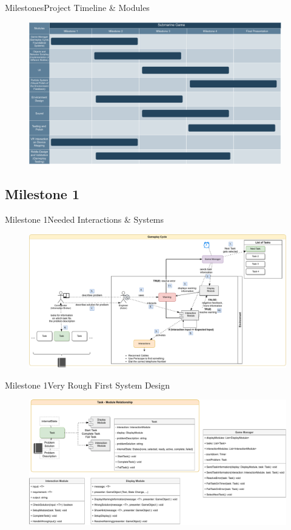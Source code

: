 \documentclass[t,aspectratio=169,divpsnames]{beamer}
\begin{document}
\begin{frame}{Milestones}{Project Timeline \& Modules}
    \begin{figure}
    \vspace{-0.1cm}
	\includegraphics[width=11cm]{images/Timeline_VR-AR.pdf}
	
\end{figure}
\end{frame}
\subsection{Milestone 1}
\begin{frame}{Milestone 1}{Needed Interactions \& Systems}
    \begin{figure}
    \vspace{-0.1cm}
	\includegraphics[width=12.5cm]{images/gameplay_cycle.pdf}
	
\end{figure}
\end{frame}

\begin{frame}{Milestone 1}{Very Rough First System Design}
    \begin{figure}
	\includegraphics[width=12.5cm]{images/system_architecture.pdf}
     \vspace{-1.0cm}
\end{figure}
\end{frame}
\end{document}
